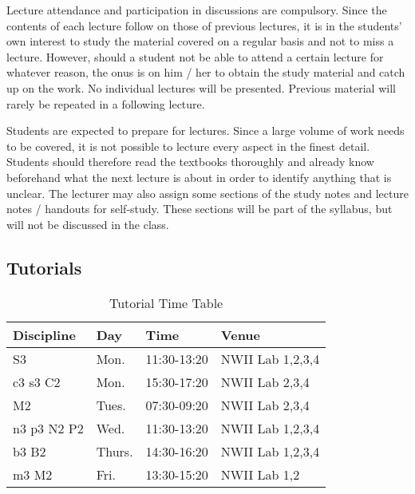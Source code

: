         Lecture attendance and participation in discussions are compulsory.
        Since the contents of each lecture follow on those of previous
        lectures, it is in the students’ own interest to study the material
        covered on a regular basis and not to miss a lecture. However, should a
        student not be able to attend a certain lecture for whatever reason,
        the onus is on him / her to obtain the study material and catch up on
        the work. No individual lectures will be presented. Previous material
        will rarely be repeated in a following lecture.

        Students are expected to prepare for lectures. Since a large volume of
        work needs to be covered, it is not possible to lecture every aspect in
        the finest detail. Students should therefore read the textbooks
        thoroughly and already know beforehand what the next lecture is about
        in order to identify anything that is unclear. The lecturer may also
        assign some sections of the study notes and lecture notes / handouts
        for self-study.  These sections will be part of the syllabus, but will
        not be discussed in the class.

    \subsection{Tutorials}
        \begin{table}[!h]
            \begin{center}
            \begin{tabular}{|l|l|l|l|}
                \hline
                {\bf Discipline} & {\bf Day} & {\bf Time} & {\bf Venue} \\
                \hline
                S3          & Mon.   & 11:30-13:20 & NWII Lab 1,2,3,4 \\
                c3 s3 C2    & Mon.   & 15:30-17:20 & NWII Lab 2,3,4 \\
                M2          & Tues.  & 07:30-09:20 & NWII Lab 2,3,4 \\
                n3 p3 N2 P2 & Wed.   & 11:30-13:20 & NWII Lab 1,2,3,4 \\
                b3 B2       & Thurs. & 14:30-16:20 & NWII Lab 1,2,3,4 \\
                m3 M2       & Fri.   & 13:30-15:20 & NWII Lab 1,2 \\
                \hline
            \end{tabular}
            \caption{Tutorial Time Table}
            \label{tab:tutorials}
            \end{center}
        \end{table}

